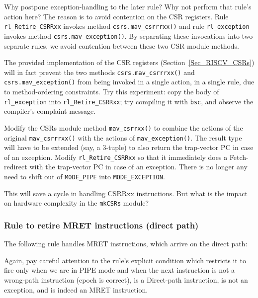 Why postpone exception-handling to the later rule?  Why not perform
that rule's action here?  The reason is to avoid contention on the CSR
registers.  Rule \verb|rl_Retire_CSRRxx| invokes method
\verb|csrs.mav_csrrrxx()| and rule \verb|rl_exception| invokes method
\verb|csrs.mav_exception()|.  By separating these invocations into two
separate rules, we avoid contention between these two CSR module
methods.


\Exercise

The provided implementation of the CSR registers
(Section~\ref{Sec_RISCV_CSRs}) will in fact prevent the two methods
\verb|csrs.mav_csrrrxx()| and \verb|csrs.mav_exception()| from being
invoked in a single action, {\ie} in a single rule, due to
method-ordering constraints.  Try this experiment: copy the body of
\verb|rl_exception| into \verb|rl_Retire_CSRRxx|; try compiling it
with \verb|bsc|, and observe the compiler's complaint message.

\Exercise

Modify the CSRs module method \verb|mav_csrrxx()| to combine the
actions of the original \verb|mav_csrrrxx()| with the actions of
\verb|mav_exception()|.  The result type will have to be extended
(say, a 3-tuple) to also return the trap-vector PC in case of an
exception.  Modify \verb|rl_Retire_CSRRxx| so that it immediately does
a Fetch-redirect with the trap-vector PC in case of an exception.
There is no longer any need to shift out of \verb|MODE_PIPE| into
\verb|MODE_EXCEPTION|.

\vspace{1ex}

This will save a cycle in handling CSRRxx instructions.  But what is
the impact on hardware complexity in the \verb|mkCSRs| module?

\Endexercise


\subsubsection{Rule to retire MRET instructions (direct path)}

The following rule handles MRET instructions, which arrive on the direct path:



Again, pay careful attention to the rule's explicit condition which
restricts it to fire only when we are in PIPE mode and when the next
instruction is not a wrong-path instruction (epoch is correct), is a
Direct-path instruction, is not an exception, and is indeed an MRET
instruction.


